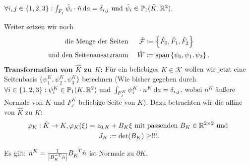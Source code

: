 \begin{remark}
 	$\forall i,j\in\{1,2,3\}: \int_{F_j} \hat{\psi}_i \cdot \hat{n} \mathop{}\!\mathrm{d} a = \delta_{i,j} \text{ und } \hat{\psi}_i \in \mathbb{P}_1(\hat{K}, \mathbb{R}^2).$
\end{remark}

Weiter setzen wir noch 
\begin{align*}
\text{ die Menge der Seiten }&& \hat{\mathcal{F}} &\coloneqq \left\{ \hat{F}_0, \hat{F}_1, \hat{F}_2 \right\} \\
\text{und den Seitenansatzraum }&&  \hat{W} &\coloneqq \operatorname{span} \left\{ \psi_0,\psi_1, \psi_2 \right\}.
\end{align*}
\textbf{Transformation von $ \hat{K} $ zu $ K $:} Für ein beliebiges $ K \in \mathcal{K} $ wollen wir jetzt eine Seitenbasis $ \{ \psi_1^K, \psi_2^K, \psi_3^K \} $ berechnen (Wie bisher gegeben durch $ \forall i\in\{1,2,3\}: \psi_i^K\in\mathbb{P}_1(K,\mathbb{R}^2) \text{ und } \int_{F_j^K} \psi_i^K \cdot n^K \mathop{}\!\mathrm{d} a = \delta_{i,j} $, wobei $ n^K $ äußere Normale von  $ K $ und $ F_j^K  $ beliebige Seite von $ K $). Dazu betrachten wir die affine  von $ \hat{K} $ zu $ K $:
\begin{gather*}
	\varphi_K: \hat{K} \to K, \varphi_K(\xi) = z_{0,K} + B_K \xi \text{ mit passenden } B_K\in\mathbb{R}^{2 \times 2} \text{ und } \\
	J_K \coloneqq \det(B_K) \geq !!!.
\end{gather*}
\begin{Lemma}
	Es gilt: $\tilde{n}^K = \frac{1}{\abs{B_K^{-T} \hat{n}}} B_K^{-T} \hat{n} $ ist Normale zu $ \partial K $.
\end{Lemma}
\begin{remark}
\end{remark} 
